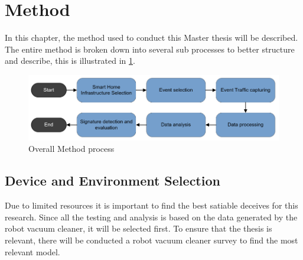 \chapter*{Method}
\label{cap:Method}

In this chapter, the method used to conduct this Master thesis will be described. The entire method is broken down into several sub processes to better structure and describe, this is illustrated in \ref{fig:Method_process}.  

\begin{figure}[H]
    \centering
    \includegraphics[width=\textwidth]{figures/Method_process.png}
    \caption{Overall Method process}
    \label{fig:Method_process}
\end{figure}



\section{Device and Environment Selection}
Due to limited resources it is important to find the best satiable deceives for this research. Since all the testing and analysis is based on the data generated by the robot vacuum cleaner, it will be selected first. To ensure that the thesis is relevant, there will be conducted a robot vacuum cleaner survey to find the most relevant model.

